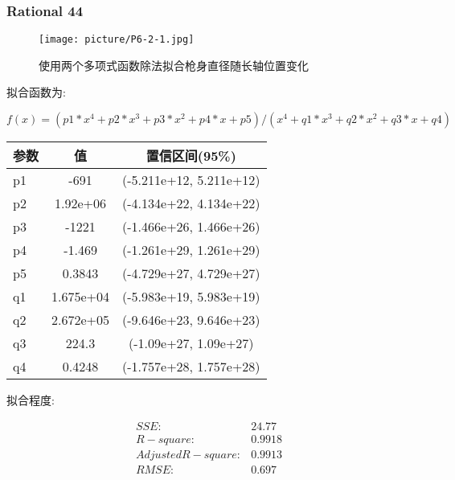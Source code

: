 \documentclass[UTF8]{ctexart}
\begin{document}
				\subsubsection{Rational 44}
				\begin{figure}[h]
					\texttt{[image: picture/P6-2-1.jpg]}
					\caption{使用两个多项式函数除法拟合枪身直径随长轴位置变化}
				\end{figure}
				\begin{flushleft}
					拟合函数为:
				\end{flushleft}
				\begin{center}
					$$   f(x) = (p1*x^4 + p2*x^3 + p3*x^2 + p4*x + p5) /
					(x^4 + q1*x^3 + q2*x^2 + q3*x + q4)
					$$		
					\begin{tabular}{|l|c|c|}
						\hline
						参数&值&置信区间(95\%)\\
						\hline
						 p1 &        -691&  (-5.211e+12, 5.211e+12)\\
						 \hline
						p2 &   1.92e+06&  (-4.134e+22, 4.134e+22)\\
						\hline
						p3 &       -1221&  (-1.466e+26, 1.466e+26)\\
						\hline
						p4 &      -1.469&  (-1.261e+29, 1.261e+29)\\
						\hline
						p5 &      0.3843&  (-4.729e+27, 4.729e+27)\\
						\hline
						q1 &   1.675e+04&  (-5.983e+19, 5.983e+19)\\
						\hline
						q2 &   2.672e+05&  (-9.646e+23, 9.646e+23)\\
						\hline
						q3 &       224.3&  (-1.09e+27, 1.09e+27)\\
						\hline
						q4 &      0.4248&  (-1.757e+28, 1.757e+28)\\
						\hline						
					\end{tabular}
				\end{center}
				\begin{flushleft}
					拟合程度:
				\end{flushleft}
				\begin{center}
					$$
					\begin{matrix}
					SSE:&24.77\\
					R-square:&0.9918\\
					Adjusted R-square:&0.9913\\
					RMSE:&0.697\\
					\end{matrix}
					$$
				\end{center}
\end{document}
